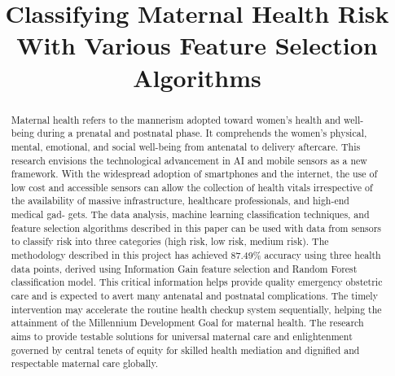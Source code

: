 \documentclass[conference]{IEEEtran}
\begin{document}
\title{Classifying Maternal Health Risk With Various Feature Selection Algorithms
}

\author{

\and
{}
\and
{}
}

\maketitle

\begin{abstract}
Maternal health refers to the mannerism adopted
toward women's health and well-being during a prenatal and
postnatal phase. It comprehends the women's physical, mental, emotional, and social well-being from antenatal to
delivery aftercare. This research envisions the technological advancement in AI and mobile sensors as a new framework. With the widespread adoption of smartphones and the internet, the use of low cost and accessible sensors can allow
the collection of health vitals irrespective of the availability of massive
infrastructure, healthcare professionals, and high-end medical gad-
gets. The data analysis, machine learning classification techniques, and feature selection algorithms described in this paper can be
used with data from sensors to classify risk into three categories
(high risk, low risk, medium risk). The methodology described
in this project has achieved 87.49\% accuracy using three health
data points, derived using Information Gain feature selection
and Random Forest classification model. This critical information
helps provide quality emergency obstetric care and
is expected to avert many antenatal and postnatal
complications. The timely intervention may accelerate the routine
health checkup system sequentially, helping the attainment of
the Millennium Development Goal for maternal health. The research
aims to provide testable solutions for universal maternal
care and enlightenment governed by central tenets of equity for
skilled health mediation and dignified and respectable maternal care
globally.
\end{abstract}
\end{document}
